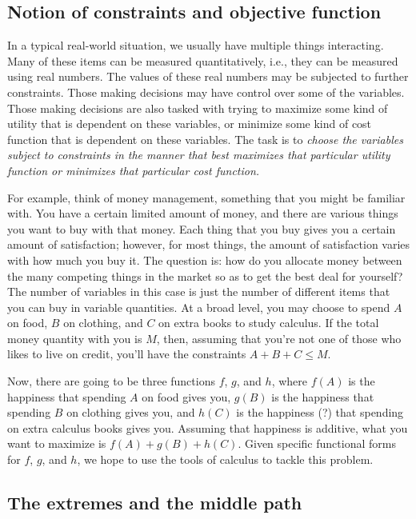 \documentclass[10pt]{amsart}
\begin{document}
\subsection{Notion of constraints and objective function}

In a typical real-world situation, we usually have multiple things
interacting. Many of these items can be measured quantitatively, i.e.,
they can be measured using real numbers. The values of these real
numbers may be subjected to further constraints. Those making
decisions may have control over some of the variables. Those making
decisions are also tasked with trying to maximize some kind of utility
that is dependent on these variables, or minimize some kind of cost
function that is dependent on these variables. The task is to {\em
choose the variables subject to constraints in the manner that best
maximizes that particular utility function or minimizes that
particular cost function.}

For example, think of money management, something that you might be
familiar with. You have a certain limited amount of money, and there
are various things you want to buy with that money. Each thing that
you buy gives you a certain amount of satisfaction; however, for most
things, the amount of satisfaction varies with how much you buy
it. The question is: how do you allocate money between the many
competing things in the market so as to get the best deal for
yourself? The number of variables in this case is just the number of
different items that you can buy in variable quantities. At a broad
level, you may choose to spend $A$ on food, $B$ on clothing, and $C$
on extra books to study calculus. If the total money quantity with you
is $M$, then, assuming that you're not one of those who likes to live
on credit, you'll have the constraints $A + B + C \le M$.

Now, there are going to be three functions $f$, $g$, and $h$, where
$f(A)$ is the happiness that spending $A$ on food gives you, $g(B)$ is
the happiness that spending $B$ on clothing gives you, and $h(C)$ is
the happiness (?) that spending on extra calculus books gives
you. Assuming that happiness is additive, what you want to maximize is
$f(A) + g(B) + h(C)$. Given specific functional forms for $f$, $g$,
and $h$, we hope to use the tools of calculus to tackle this problem.

\subsection{The extremes and the middle path}
\end{document}
